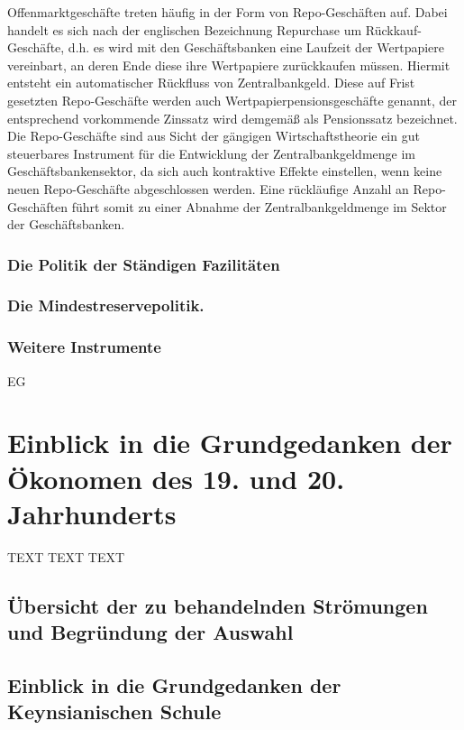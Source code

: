 \documentclass[
onecolumn,
a4paper,
abstracton,
parskip=half
,final
]{scrartcl}
\begin{document}
Offenmarktgesch{\"a}fte treten h{\"a}ufig in der Form von Repo-Gesch{\"a}ften auf. Dabei handelt es sich nach der englischen Bezeichnung Repurchase um R{\"u}ckkauf-Gesch{\"a}fte, d.h. es wird mit den Gesch{\"a}ftsbanken eine Laufzeit der Wertpapiere vereinbart, an deren Ende diese ihre Wertpapiere zur{\"u}ckkaufen m{\"u}ssen. Hiermit entsteht ein automatischer R{\"u}ckfluss von Zentralbankgeld. Diese auf Frist gesetzten Repo-Gesch{\"a}fte werden auch Wertpapierpensionsgesch{\"a}fte genannt, der entsprechend vorkommende Zinssatz wird demgem{\"a}ß als Pensionssatz bezeichnet.
Die Repo-Gesch{\"a}fte sind aus Sicht der g{\"a}ngigen Wirtschaftstheorie ein gut steuerbares Instrument f{\"u}r die Entwicklung der Zentralbankgeldmenge im Gesch{\"a}ftsbankensektor, da sich auch kontraktive Effekte einstellen, wenn keine neuen Repo-Gesch{\"a}fte abgeschlossen werden. Eine r{\"u}ckl{\"a}ufige Anzahl an Repo-Gesch{\"a}ften f{\"u}hrt somit zu einer Abnahme der Zentralbankgeldmenge im Sektor der Gesch{\"a}ftsbanken.


\subsubsection{Die Politik der St{\"a}ndigen Fazilit{\"a}ten}
\subsubsection{Die Mindestreservepolitik.}
\subsubsection{Weitere Instrumente}





\ac{EG}



\section{Einblick in die Grundgedanken der {\"O}konomen des 19. und 20. Jahrhunderts}
\label{sec1:stroemungen}
TEXT TEXT TEXT


\subsection{{\"U}bersicht der zu behandelnden Str{\"o}mungen und Begr{\"u}ndung der Auswahl}

\subsection{Einblick in die Grundgedanken der Keynsianischen Schule}
\end{document}
